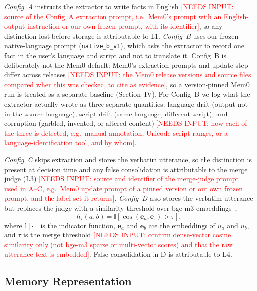 \documentclass[conference]{IEEEtran}
\newcommand{\pending}[1]{\textcolor{red}{#1}}
\begin{document}
\textit{Config~A} instructs the extractor to write facts in English
\pending{[NEEDS INPUT: source of the Config~A extraction prompt, i.e.\ Mem0's
prompt with an English-output instruction or our own frozen prompt, with
its identifier]}, so any distinction lost before storage is attributable
to L1. \textit{Config~B} uses our frozen native-language prompt
(\texttt{native\_b\_v1}), which asks the extractor to record one fact in
the user's language and script and not to translate it. Config~B is
deliberately not the Mem0 default: Mem0's extraction prompts and update
step differ across releases
\pending{[NEEDS INPUT: the Mem0 release versions and source files compared
when this was checked, to cite as evidence]}, so a version-pinned Mem0 run
is treated as a separate baseline (Section~IV). For Config~B we log what the extractor
actually wrote as three separate quantities: language drift (output not in
the source language), script drift (same language, different script), and
corruption (garbled, invented, or altered content)
\pending{[NEEDS INPUT: how each of the three is detected, e.g.\ manual
annotation, Unicode script ranges, or a language-identification tool, and
by whom]}.

\textit{Config~C} skips extraction and stores the verbatim utterance, so
the distinction is present at decision time and any false consolidation
is attributable to the merge judge (L3)
\pending{[NEEDS INPUT: source and identifier of the merge-judge prompt used
in A--C, e.g.\ Mem0 update prompt of a pinned version or our own frozen
prompt, and the label set it returns]}. \textit{Config~D} also stores the
verbatim utterance but replaces the judge with a similarity threshold over
bge-m3 embeddings~\cite{bgem3},
\begin{equation}
h_\tau(a,b) = \mathbb{I}\!\left[\cos(\mathbf{e}_a,\mathbf{e}_b) > \tau\right],
\label{eq:threshold}
\end{equation}
where $\mathbb{I}[\cdot]$ is the indicator function, $\mathbf{e}_a$ and
$\mathbf{e}_b$ are the embeddings of $u_a$ and $u_b$, and $\tau$ is the
merge threshold
\pending{[NEEDS INPUT: confirm dense-vector cosine similarity only (not
bge-m3 sparse or multi-vector scores) and that the raw utterance text is
embedded]}. False consolidation in D is attributable to L4.

\subsection{Memory Representation}
\end{document}
